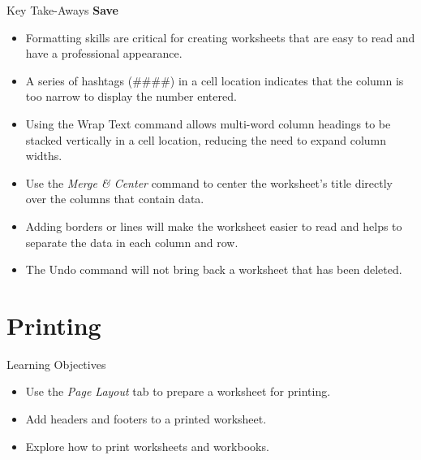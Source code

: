\begin{center}
	\begin{tkwbox}{Key Take-Aways}
		\textbf{Save}
		\\
		\begin{itemize}
			\setlength{\itemsep}{0pt}
			\setlength{\parskip}{0pt}
			\setlength{\parsep}{0pt}
			
			\item Formatting skills are critical for creating worksheets that are easy to read and have a professional appearance.
			\item A series of hashtags (\#\#\#\#) in a cell location indicates that the column is too narrow to display the number entered.
			\item Using the Wrap Text command allows multi-word column headings to be stacked vertically in a cell location, reducing the need to expand column widths.
			\item Use the \textit{Merge \& Center} command to center the worksheet's title directly over the columns that contain data.
			\item Adding borders or lines will make the worksheet easier to read and helps to separate the data in each column and row.
			\item The Undo command will not bring back a worksheet that has been deleted.
			
			
		
		\end{itemize}
	\end{tkwbox}
\end{center}

\section{Printing}

\begin{center}
	\begin{objbox}{Learning Objectives}
		\begin{itemize}
			\setlength{\itemsep}{0pt}
			\setlength{\parskip}{0pt}
			\setlength{\parsep}{0pt}
			
			\item Use the \textit{Page Layout} tab to prepare a worksheet for printing.
			\item Add headers and footers to a printed worksheet.
			\item Explore how to print worksheets and workbooks.
		\end{itemize}
	\end{objbox}
\end{center}

